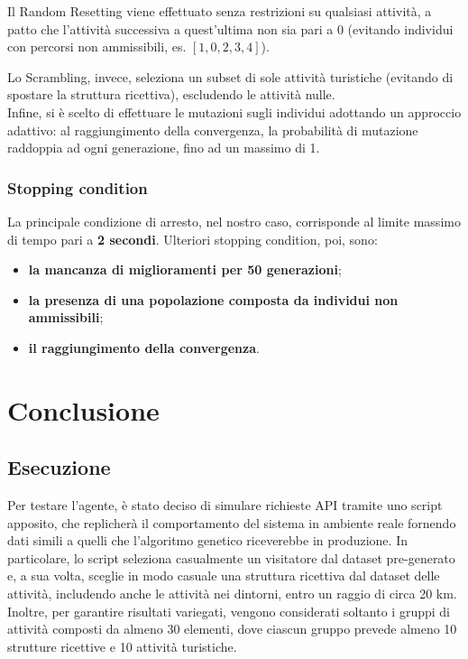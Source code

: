 \documentclass{CSUniSchoolLabReport}
\begin{document}
Il Random Resetting viene effettuato senza restrizioni su qualsiasi attività, a patto che l'attività successiva a quest'ultima non sia pari a 0 (evitando individui con percorsi non ammissibili, es. $[1, 0, 2, 3, 4]$).

Lo Scrambling, invece, seleziona un subset di sole attività turistiche (evitando di spostare la struttura ricettiva), escludendo le attività nulle. \\

Infine, si è scelto di effettuare le mutazioni sugli individui adottando un approccio adattivo: al raggiungimento della convergenza, la probabilità di mutazione raddoppia ad ogni generazione, fino ad un massimo di 1.

\subsubsection{Stopping condition}

La principale condizione di arresto, nel nostro caso, corrisponde al limite massimo di tempo pari a \textbf{2 secondi}.
Ulteriori stopping condition, poi, sono:
\begin{itemize}
	\item \textbf{la mancanza di miglioramenti per 50 generazioni};
	\item \textbf{la presenza di una popolazione composta da individui non ammissibili};
	\item \textbf{il raggiungimento della convergenza}.
\end{itemize}

\pagebreak{}

\section{Conclusione}
\subsection{Esecuzione}

Per testare l'agente, è stato deciso di simulare richieste API tramite uno script apposito, che replicherà il comportamento del sistema in ambiente reale fornendo dati simili a quelli che l'algoritmo genetico riceverebbe in produzione. In particolare, lo script seleziona casualmente un visitatore dal dataset pre-generato e, a sua volta, sceglie in modo casuale una struttura ricettiva dal dataset delle attività, includendo anche le attività nei dintorni, entro un raggio di circa 20 km. Inoltre, per garantire risultati variegati, vengono considerati soltanto i gruppi di attività composti da almeno 30 elementi, dove ciascun gruppo prevede almeno 10 strutture ricettive e 10 attività turistiche.
\end{document}
